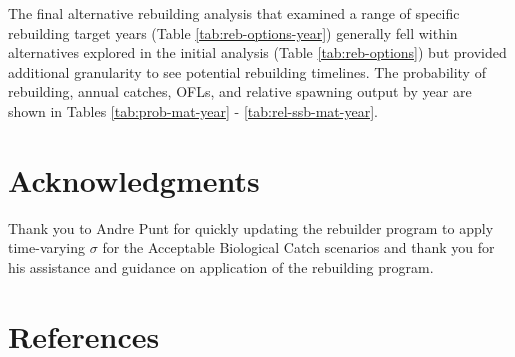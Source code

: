 \documentclass[11pt,
  english,
  a4paper,
]{article}
\begin{document}
\leavevmode\tagmcend\tagstructend\par


The final alternative rebuilding analysis that examined a range of specific rebuilding target years (Table \ref{tab:reb-options-year}) generally fell within alternatives explored in the initial analysis (Table \ref{tab:reb-options}) but provided additional granularity to see potential rebuilding timelines. The probability of rebuilding, annual catches, OFLs, and relative spawning output by year are shown in Tables \ref{tab:prob-mat-year} - \ref{tab:rel-ssb-mat-year}.

\leavevmode\tagmcend\tagstructend\par


\hypertarget{acknowledgments}{%
\section{Acknowledgments}\label{acknowledgments}}

\leavevmode\tagmcend\tagstructend


Thank you to Andre Punt for quickly updating the rebuilder program to apply time-varying {\(\sigma\)\leavevmode\tagmcend\tagstructend} for the Acceptable Biological Catch scenarios and thank you for his assistance and guidance on application of the rebuilding program.

\leavevmode\tagmcend\tagstructend\par

\clearpage


\hypertarget{references}{%
\section{References}\label{references}}

\leavevmode\tagmcend\tagstructend

\end{document}
